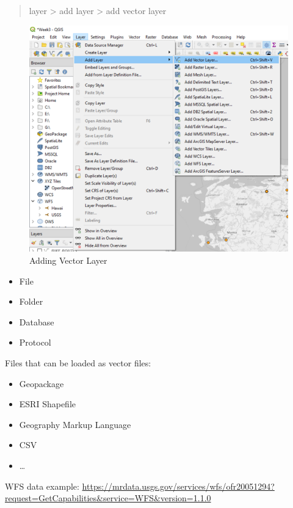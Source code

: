 \documentclass[
]{book}
\providecommand{\tightlist}{%
  \setlength{\itemsep}{0pt}\setlength{\parskip}{0pt}}
\begin{document}
\begin{quote}
layer \textgreater{} add layer \textgreater{} add vector layer
\end{quote}

\begin{figure}
\centering
\includegraphics{Images/addVectorLayer.png}
\caption{Adding Vector Layer}
\end{figure}

\begin{itemize}
\tightlist
\item
  File
\item
  Folder
\item
  Database
\item
  Protocol
\end{itemize}

Files that can be loaded as vector files:

\begin{itemize}
\tightlist
\item
  Geopackage
\item
  ESRI Shapefile
\item
  Geography Markup Language
\item
  CSV
\item
  \ldots{}
\end{itemize}

WFS data example:
\url{https://mrdata.usgs.gov/services/wfs/ofr20051294?request=GetCapabilities\&service=WFS\&version=1.1.0}
\end{document}
